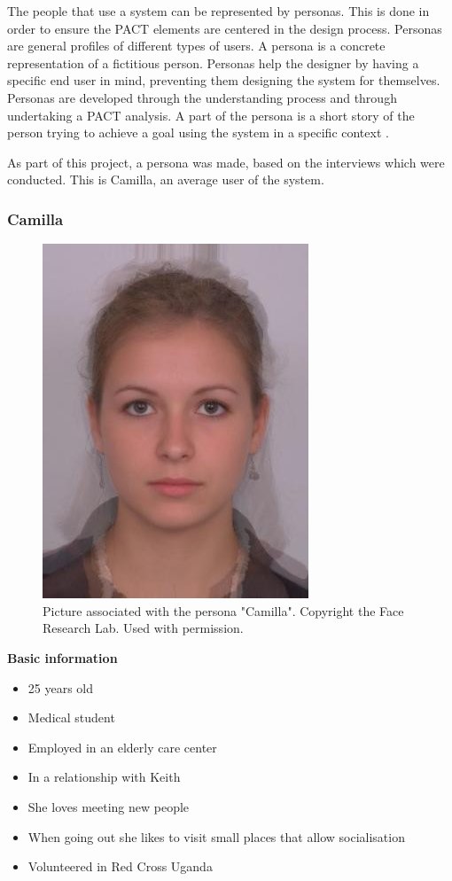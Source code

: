 The people that use a system can be represented by personas. This is done in order to ensure the PACT elements are centered in the design process. Personas are general profiles of different types of users. A persona is a concrete representation of a fictitious person. Personas help the designer by having a specific end user in mind, preventing them designing the system for themselves. Personas are developed through the understanding process and through undertaking a PACT analysis. A part of the persona is a short story of the person trying to achieve a goal using the system in a specific context \cite{benyon2013designing}.

As part of this project, a persona was made, based on the interviews which were conducted.%
This is Camilla, an average user of the system.

\subsubsection{Camilla}
\begin{figure} [h]
  \centering
  \includegraphics[]{Images/average.jpg}
  \caption{Picture associated with the persona "Camilla". Copyright the Face Research Lab. Used with permission.}
  \label{fig:camilla}
\end{figure}
\noindent\textbf{Basic information}
\begin{itemize}
\item 25 years old
\item Medical student
\item Employed in an elderly care center
\item In a relationship with Keith
\item She loves meeting new people
\item When going out she likes to visit small places that allow socialisation
\item Volunteered in Red Cross Uganda
\end{itemize}


